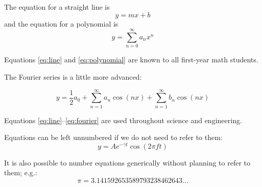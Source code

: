 The equation for a straight line is
\begin{equation} y = mx + b \label{eq:line}\end{equation} and the
equation for a polynomial is
\begin{equation} y = \sum_{n=0}^{\infty} a_n x^n \label{eq:polynomial}\end{equation}

Equations \ref{eq:line} and \ref{eq:polynomial} are known to all
first-year math students.

The Fourier series is a little more advanced:

\begin{equation} y = \frac{1}{2}a_0 + \sum_{n=1}^{\infty}a_n\cos(nx)
                      + \sum_{n=1}^{\infty}b_n\cos(nx)
\label{eq:fourier}\end{equation}

Equations \ref{eq:line}--\ref{eq:fourier} are used throughout science
and engineering.

Equations can be left unnumbered if we do not need to refer to them:
\[ y = A e^{-\gamma t}\cos(2\pi f t) \]

It is also possible to number equations generically without planning to
refer to them; e.g.:
\begin{equation} \pi = 3.141592653589793238462643\dots \label{eq:__6095300538325952338__}\end{equation}
